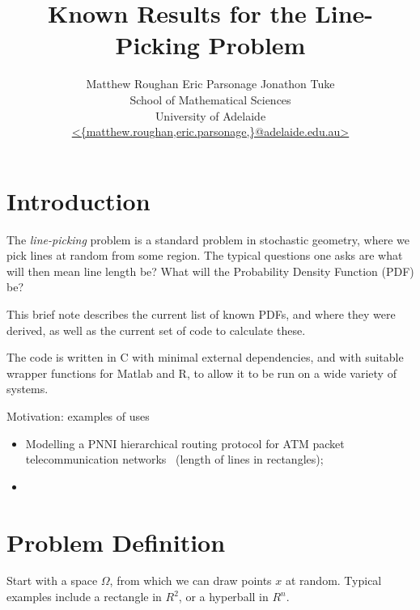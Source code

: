 \documentclass{article}
\newcommand{\titlestr}{Known Results for the Line-Picking Problem}
\begin{document}
\title{\titlestr}
\author{Matthew Roughan \;\;\; Eric Parsonage \;\;\; Jonathon Tuke \\
 School of Mathematical Sciences \\
 University of Adelaide \\
 \url{ <{matthew.roughan,eric.parsonage,}@adelaide.edu.au> } }
\maketitle

\begin{abstract}

\end{abstract}

\section{Introduction}

The {\em line-picking} problem is a standard problem in stochastic
geometry, where we pick lines at random from some region. The typical
questions one asks are what will then mean line length be? What will
the Probability Density Function (PDF) be?

This brief note describes the current list of known PDFs, and where
they were derived, as well as the current set of code to calculate
these. 

The code is written in C with minimal external dependencies, and with
suitable wrapper functions for Matlab and R, to allow it to be run on
a wide variety of systems.



Motivation: examples of uses
\begin{itemize}

\item Modelling a PNNI hierarchical routing protocol for ATM packet
  telecommunication networks~\cite{Rosenberg200499} (length of lines
  in rectangles);

\item 

\end{itemize}

\section{Problem Definition}

Start with a space $\Omega$, from which we can draw points $x$ at
random. Typical examples include a rectangle in $R^2$, or a hyperball
in $R^n$.
\end{document}
